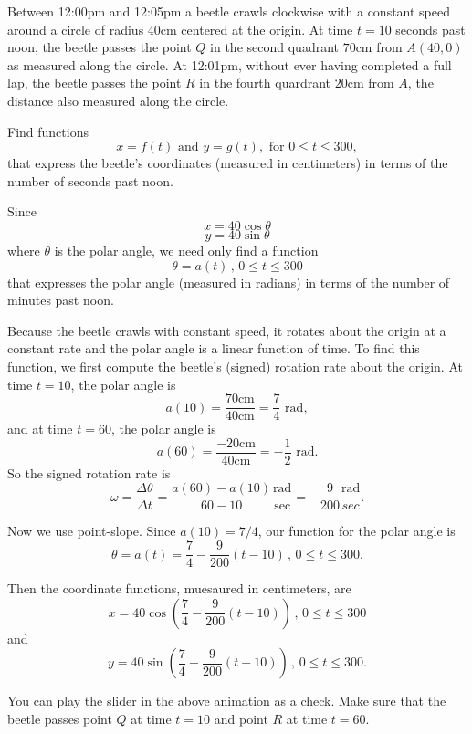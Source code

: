 \documentclass{ximera}
\begin{document}
\begin{example} \label{Qdbyp44:Motion}
Between 12:00pm and 12:05pm a beetle crawls clockwise with a constant speed around a circle of radius $40$cm centered at the origin. At time $t=10$ seconds past noon, the beetle passes the point $Q$ in the second quadrant $70$cm from $A(40,0)$ as measured along the circle. At 12:01pm, without ever having completed a full lap, the beetle passes the point $R$ in the fourth quardrant $20$cm from $A$, the distance also measured along the circle. 

Find functions
\[
   x = f(t) \text{ and } y=g(t) , \text{ for } 0\leq t \leq 300 ,
\]
that express the beetle's coordinates (measured in centimeters) in terms of the number of seconds past noon. 


\begin{explanation}
Since
\[
    x = 40 \cos \theta 
\]
\[
    y = 40\sin\theta
\]
where $\theta$ is the polar angle, we need only find a function
\[
    \theta = a(t) \, , \, 0\leq t \leq 300 
\] 
that expresses the polar angle (measured in radians) in terms of the number of minutes past noon. 


 
\begin{onlineOnly}
    \begin{center}
\end{center}
\end{onlineOnly}


Because the beetle crawls with constant speed, it rotates about the origin at a constant rate and the polar angle is a linear function of time. To find this function, we first compute the beetle's (signed) rotation rate about the origin. At time $t=10$, the polar angle is 
\[
   a(10) = \frac{70 \text{cm}}{40 \text{cm}} = \frac{7}{4}\text { rad} ,
\]
and at time $t=60$, the polar angle is
\[
   a(60) = \frac{-20 \text{cm}}{40 \text{cm}} = - \frac{1}{2}\text { rad}. 
\]
So the signed rotation rate is
\[
   \omega = \frac{\Delta \theta}{\Delta t} = \frac{a(60) - a(10)}{60 - 10 } \frac{\text{rad}}{\text{sec}} = -\frac{9}{200} \frac{\text{rad}}{sec} .
\]

Now we use point-slope. Since $a(10)=7/4$, our function for the polar angle is
\[
    \theta = a(t) = \frac{7}{4} - \frac{9}{200}\left(  t  - 10 \right) \, , \, 0\leq t \leq 300.
\]

Then the coordinate functions, muesaured in centimeters, are
\[
      x = 40 \cos \left(   \frac{7}{4} - \frac{9}{200}\left(  t  - 10 \right)  \right) \, , \, 0\leq t \leq 300
\] 
and
\[
     y =  40 \sin \left(   \frac{7}{4} - \frac{9}{200}\left(  t  - 10 \right)  \right) \, , \, 0\leq t \leq 300 .
\] 


You can play the slider in the above animation as a check. Make sure that the beetle passes point $Q$ at time $t=10$ and point $R$ at time $t=60$.
\end{explanation}
\end{example}
\end{document}
